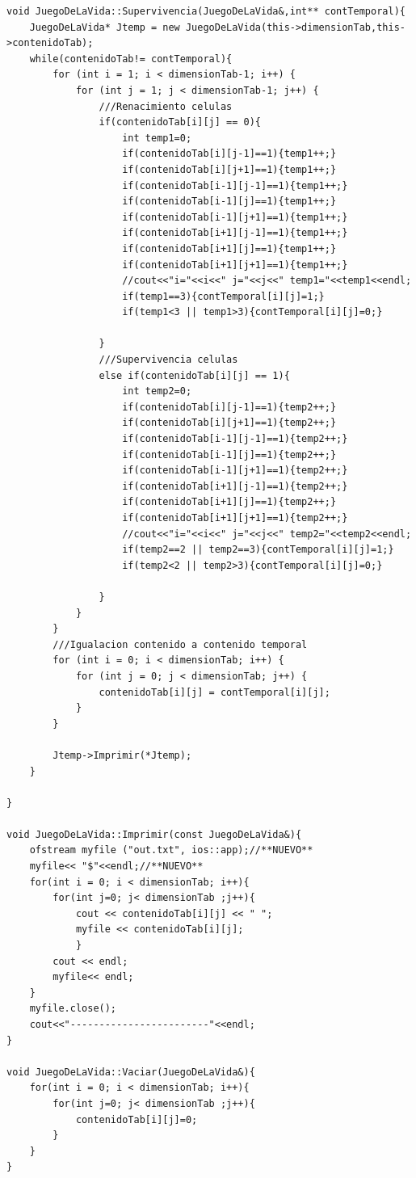 \documentclass[12pt,letterpaper]{article}
\begin{document}
\begin{lstlisting}
void JuegoDeLaVida::Supervivencia(JuegoDeLaVida&,int** contTemporal){
    JuegoDeLaVida* Jtemp = new JuegoDeLaVida(this->dimensionTab,this->contenidoTab);
    while(contenidoTab!= contTemporal){
        for (int i = 1; i < dimensionTab-1; i++) {
            for (int j = 1; j < dimensionTab-1; j++) {
                ///Renacimiento celulas 
                if(contenidoTab[i][j] == 0){
                    int temp1=0;
                    if(contenidoTab[i][j-1]==1){temp1++;}
                    if(contenidoTab[i][j+1]==1){temp1++;}
                    if(contenidoTab[i-1][j-1]==1){temp1++;}
                    if(contenidoTab[i-1][j]==1){temp1++;}
                    if(contenidoTab[i-1][j+1]==1){temp1++;}
                    if(contenidoTab[i+1][j-1]==1){temp1++;}
                    if(contenidoTab[i+1][j]==1){temp1++;}
                    if(contenidoTab[i+1][j+1]==1){temp1++;}
                    //cout<<"i="<<i<<" j="<<j<<" temp1="<<temp1<<endl;
                    if(temp1==3){contTemporal[i][j]=1;}
                    if(temp1<3 || temp1>3){contTemporal[i][j]=0;}

                }
                ///Supervivencia celulas
                else if(contenidoTab[i][j] == 1){
                    int temp2=0;
                    if(contenidoTab[i][j-1]==1){temp2++;}
                    if(contenidoTab[i][j+1]==1){temp2++;}
                    if(contenidoTab[i-1][j-1]==1){temp2++;}
                    if(contenidoTab[i-1][j]==1){temp2++;}
                    if(contenidoTab[i-1][j+1]==1){temp2++;}
                    if(contenidoTab[i+1][j-1]==1){temp2++;}
                    if(contenidoTab[i+1][j]==1){temp2++;}
                    if(contenidoTab[i+1][j+1]==1){temp2++;}
                    //cout<<"i="<<i<<" j="<<j<<" temp2="<<temp2<<endl;
                    if(temp2==2 || temp2==3){contTemporal[i][j]=1;}
                    if(temp2<2 || temp2>3){contTemporal[i][j]=0;}

                }
            }
        }
        ///Igualacion contenido a contenido temporal
        for (int i = 0; i < dimensionTab; i++) {
            for (int j = 0; j < dimensionTab; j++) {
                contenidoTab[i][j] = contTemporal[i][j];
            }
        }
        
        Jtemp->Imprimir(*Jtemp); 
    }
    
}

void JuegoDeLaVida::Imprimir(const JuegoDeLaVida&){
    ofstream myfile ("out.txt", ios::app);//**NUEVO**
    myfile<< "$"<<endl;//**NUEVO**
    for(int i = 0; i < dimensionTab; i++){
        for(int j=0; j< dimensionTab ;j++){
            cout << contenidoTab[i][j] << " ";
            myfile << contenidoTab[i][j];
            }
        cout << endl;
        myfile<< endl;
    }
    myfile.close();
    cout<<"------------------------"<<endl;
}

void JuegoDeLaVida::Vaciar(JuegoDeLaVida&){
    for(int i = 0; i < dimensionTab; i++){
        for(int j=0; j< dimensionTab ;j++){
            contenidoTab[i][j]=0;
        }
    }
}

\end{lstlisting}
\end{document}
